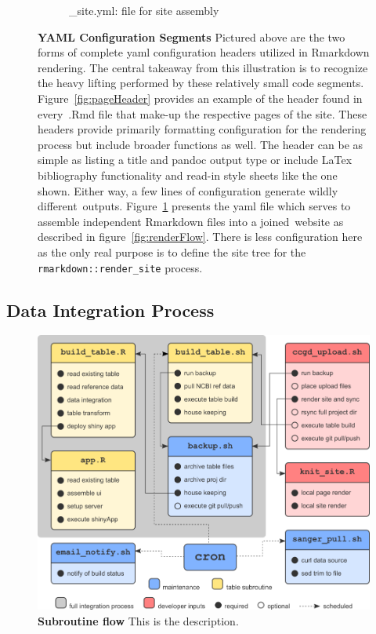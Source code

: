 \documentclass[10pt]{report}
\begin{document}
\begin{figure}
\begin{subfigure}[t]{.4\textwidth}
\caption{\_site.yml: file for site assembly}\label{fig:siteYaml}
\end{subfigure}
\caption[YAML Configuration Segments]{\textbf{YAML Configuration Segments} Pictured above are the two forms of complete yaml configuration headers utilized in Rmarkdown rendering. The central takeaway from this illustration is to recognize the heavy lifting performed by these relatively small code segments. Figure~\ref{fig:pageHeader} provides an example of the header found in every~.Rmd file that make-up the respective pages of the site. These headers provide primarily formatting configuration for the rendering process but include broader functions as well. The header can be as simple as listing a title and pandoc output type or include LaTex bibliography functionality and read-in style sheets like the one shown. Either way, a few lines of configuration generate wildly different outputs. Figure~\ref{fig:siteYaml} presents the yaml file which serves to assemble independent Rmarkdown files into a joined website as described in figure~\ref{fig:renderFlow}. There is less configuration here as the only real purpose is to define the site tree for the \texttt{rmarkdown::render\_site} process.}\label{fig:yamls}
\end{figure}

\subsection{Data Integration Process}

\begin{figure}[H]
    \centering
    \includegraphics[width=\textwidth]{fig/subroutine_flow.png}
    \caption[Subroutine flow]{\textbf{Subroutine flow} This is the description.}\label{fig:subroutine}
\end{figure}
\end{document}
